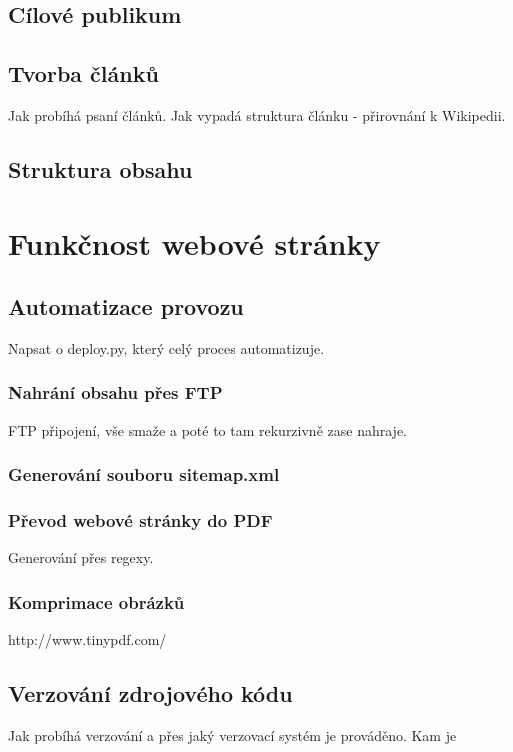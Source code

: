 \documentclass[a4paper, 12pt]{article}
\begin{document}
  \subsection{Cílové publikum}

  \subsection{Tvorba článků}
  Jak probíhá psaní článků.
  Jak vypadá struktura článku - přirovnání k Wikipedii.

  \subsection{Struktura obsahu}

  \section{Funkčnost webové stránky}

  \subsection{Automatizace provozu}
  Napsat o deploy.py, který celý proces automatizuje.

  \subsubsection{Nahrání obsahu přes FTP}
  FTP připojení, vše smaže a poté to tam rekurzivně zase nahraje.

  \subsubsection{Generování souboru sitemap.xml}

  \subsubsection{Převod webové stránky do PDF}
  Generování přes regexy.

  \subsubsection{Komprimace obrázků}
  http://www.tinypdf.com/

  \subsection{Verzování zdrojového kódu}
  Jak probíhá verzování a přes jaký verzovací systém je prováděno.
  Kam je
\end{document}
